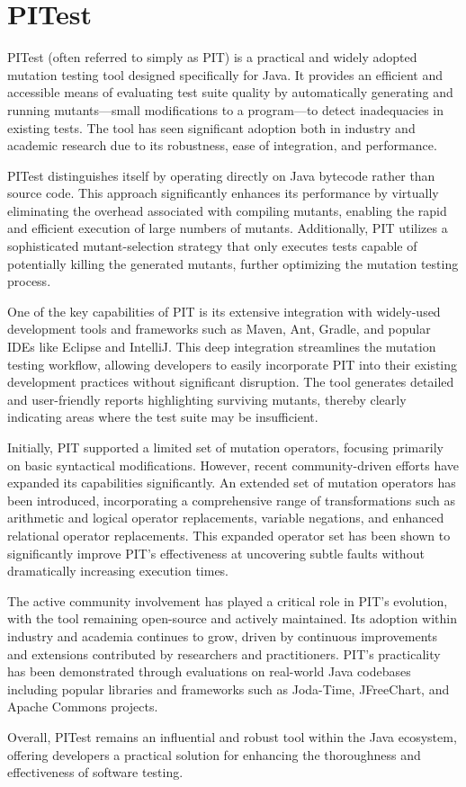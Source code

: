 \section{PITest}

PITest (often referred to simply as PIT) is a practical and widely adopted mutation testing tool designed specifically for Java. It provides an efficient and accessible means of evaluating test suite quality by automatically generating and running mutants—small modifications to a program—to detect inadequacies in existing tests. The tool has seen significant adoption both in industry and academic research due to its robustness, ease of integration, and performance.

PITest distinguishes itself by operating directly on Java bytecode rather than source code. This approach significantly enhances its performance by virtually eliminating the overhead associated with compiling mutants, enabling the rapid and efficient execution of large numbers of mutants. Additionally, PIT utilizes a sophisticated mutant-selection strategy that only executes tests capable of potentially killing the generated mutants, further optimizing the mutation testing process.

One of the key capabilities of PIT is its extensive integration with widely-used development tools and frameworks such as Maven, Ant, Gradle, and popular IDEs like Eclipse and IntelliJ. This deep integration streamlines the mutation testing workflow, allowing developers to easily incorporate PIT into their existing development practices without significant disruption. The tool generates detailed and user-friendly reports highlighting surviving mutants, thereby clearly indicating areas where the test suite may be insufficient.

Initially, PIT supported a limited set of mutation operators, focusing primarily on basic syntactical modifications. However, recent community-driven efforts have expanded its capabilities significantly. An extended set of mutation operators has been introduced, incorporating a comprehensive range of transformations such as arithmetic and logical operator replacements, variable negations, and enhanced relational operator replacements. This expanded operator set has been shown to significantly improve PIT's effectiveness at uncovering subtle faults without dramatically increasing execution times.

The active community involvement has played a critical role in PIT's evolution, with the tool remaining open-source and actively maintained. Its adoption within industry and academia continues to grow, driven by continuous improvements and extensions contributed by researchers and practitioners. PIT’s practicality has been demonstrated through evaluations on real-world Java codebases including popular libraries and frameworks such as Joda-Time, JFreeChart, and Apache Commons projects.

Overall, PITest remains an influential and robust tool within the Java ecosystem, offering developers a practical solution for enhancing the thoroughness and effectiveness of software testing.


